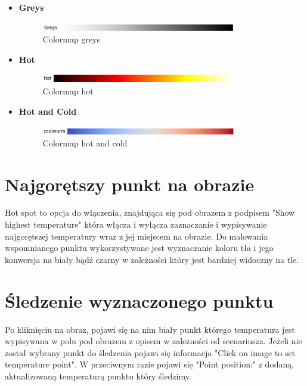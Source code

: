 \documentclass[a4paper,twoside,12pt]{book}
\begin{document}
\begin{itemize}
    \item \textbf{Greys}
    
    \begin{figure}[H]
        \centering
        \includegraphics[width=0.8\textwidth]{../../images/Greys.png}
        \caption{Colormap greys}
        \label{fig:greys}
    \end{figure}

    \item \textbf{Hot}
    
    \begin{figure}[H]
        \centering
        \includegraphics[width=0.8\textwidth]{../../images/Hot.png}
        \caption{Colormap hot}
        \label{fig:hot}
    \end{figure}

    \item \textbf{Hot and Cold}
    
    \begin{figure}[H]
        \centering
        \includegraphics[width=0.8\textwidth]{../../images/HotAndCold.png}
        \caption{Colormap hot and cold}
        \label{fig:hot-and-cold}
    \end{figure}
\end{itemize}


\section{Najgorętszy punkt na obrazie}
Hot spot to opcja do włączenia, znajdująca się pod obrazem z podpisem "Show highest temperature" która włącza i wyłącza zaznaczanie i wypisywanie najgorętszej temperatury wraz z jej miejscem na obrazie. Do malowania wspomnianego punktu wykorzystywane jest wyznaczanie koloru tła i jego konwersja na biały bądź czarny w zależności który jest bardziej widoczny na tle.
\section{Śledzenie wyznaczonego punktu}
Po kliknięciu na obraz, pojawi się na nim biały punkt którego temperatura jest wypisywana w polu pod obrazem z opisem w zależności od scenariusza. Jeżeli nie został wybrany punkt do śledzenia pojawi się informacja "Click on image to set temperature point". W przeciwnym razie pojawi się "Point position:" z dodaną, aktualizowaną temperaturą punktu który śledzimy.
\end{document}
